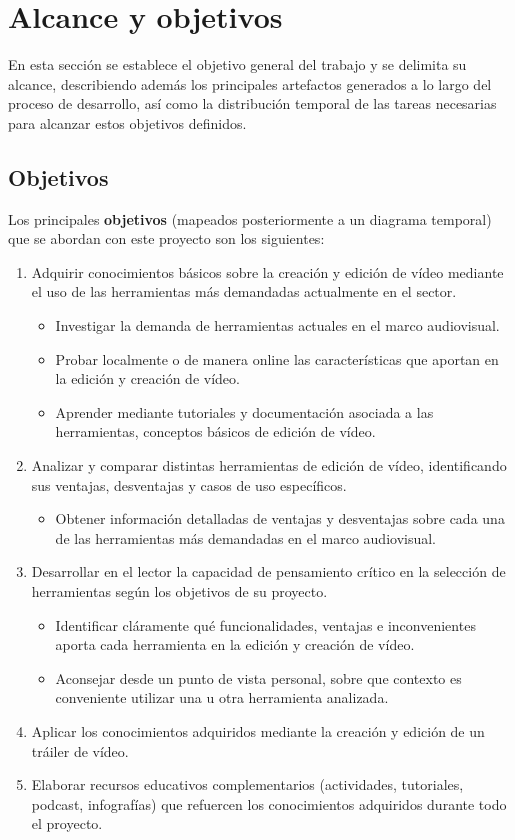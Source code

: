 \section{Alcance y objetivos}

En esta sección se establece el objetivo general del trabajo y se delimita su alcance, describiendo 
además los principales artefactos generados a lo largo del proceso de desarrollo, 
así como la distribución temporal de las tareas necesarias para alcanzar estos objetivos definidos.
\subsection{Objetivos}

Los principales \textbf{objetivos} (mapeados posteriormente a un diagrama temporal) 
que se abordan con este proyecto son los siguientes:
\begin{enumerate}[label=\arabic*.]
    \item Adquirir conocimientos básicos sobre la creación y edición de vídeo 
    mediante el uso de las herramientas más demandadas actualmente en el sector.
    \begin{itemize}
        \item Investigar la demanda de herramientas actuales en el marco audiovisual.
        \item Probar localmente o de manera online las características que aportan en la edición y creación de vídeo.
        \item Aprender mediante tutoriales y documentación asociada a las herramientas, conceptos básicos de edición de vídeo.
    \end{itemize}
    \item Analizar y comparar distintas herramientas de edición de vídeo, 
    identificando sus ventajas, desventajas y casos de uso específicos.
    \begin{itemize}
        \item Obtener información detalladas de ventajas y desventajas sobre cada una de las herramientas más demandadas en el marco audiovisual.
    \end{itemize}
    \item Desarrollar en el lector la capacidad de pensamiento crítico 
    en la selección de herramientas según los objetivos de su proyecto.
    \begin{itemize}
        \item Identificar cláramente qué funcionalidades, ventajas e inconvenientes aporta cada herramienta en la 
        edición y creación de vídeo.
        \item Aconsejar desde un punto de vista personal, sobre que contexto es conveniente utilizar una u otra herramienta analizada.
    \end{itemize}
    \item Aplicar los conocimientos adquiridos mediante la creación y edición 
    de un tráiler de vídeo.
    \item Elaborar recursos educativos complementarios 
    (actividades, tutoriales, podcast, infografías) que refuercen 
    los conocimientos adquiridos durante todo el proyecto.
\end{enumerate}

